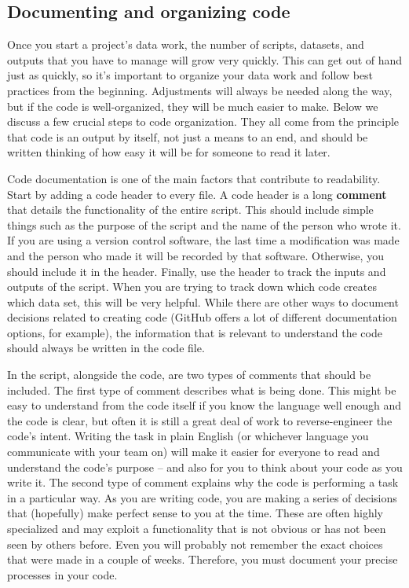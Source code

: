 \subsection{Documenting and organizing code}

Once you start a project's data work,
the number of scripts, datasets, and outputs that you have to manage will grow very quickly.
This can get out of hand just as quickly,
so it's important to organize your data work and follow best practices from the beginning.
Adjustments will always be needed along the way,
but if the code is well-organized, they will be much easier to make.
Below we discuss a few crucial steps to code organization.
They all come from the principle that code is an output by itself,
not just a means to an end,
and should be written thinking of how easy it will be for someone to read it later.

Code documentation is one of the main factors that contribute to readability.
Start by adding a code header to every file.
A code header is a long \textbf{comment}
that details the functionality of the entire script.
This should include simple things such as
the purpose of the script and the name of the person who wrote it.
If you are using a version control software,
the last time a modification was made and the person who made it will be recorded by that software.
Otherwise, you should include it in the header.
Finally, use the header to track the inputs and outputs of the script.
When you are trying to track down which code creates which data set, this will be very helpful.
While there are other ways to document decisions related to creating code
(GitHub offers a lot of different documentation options, for example),
the information that is relevant to understand the code should always be written in the code file.

In the script, alongside the code, are two types of comments that should be included.
The first type of comment describes what is being done.
This might be easy to understand from the code itself
if you know the language well enough and the code is clear,
but often it is still a great deal of work to reverse-engineer the code's intent.
Writing the task in plain English (or whichever language you communicate with your team on)
will make it easier for everyone to read and understand the code's purpose
-- and also for you to think about your code as you write it.
The second type of comment explains why the code is performing a task in a particular way.
As you are writing code, you are making a series of decisions that
(hopefully) make perfect sense to you at the time.
These are often highly specialized and may exploit a functionality
that is not obvious or has not been seen by others before.
Even you will probably not remember the exact choices that were made in a couple of weeks.
Therefore, you must document your precise processes in your code.

